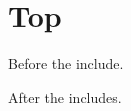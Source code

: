 \documentclass{article}
\begin{document}
\part{Top}
Before the include.


After the includes.
\end{document}
